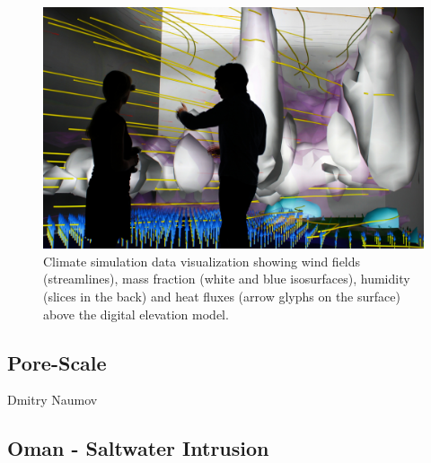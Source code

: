 \documentclass[twocolumn]{svjour3}          %
\begin{document}
\begin{figure}
  \includegraphics[width=\linewidth]{images/wind.jpg}
  \caption{Climate simulation data visualization showing wind fields (streamlines), mass fraction (white and blue isosurfaces), humidity (slices in the back) and heat fluxes (arrow glyphs on the surface) above the digital elevation model.}
\label{fig:wind}
\end{figure}

\subsection{Pore-Scale}
\label{pore-scale}

Dmitry Naumov




\subsection{Oman - Saltwater Intrusion}
\label{oman---saltwater-intrusion}
\end{document}
